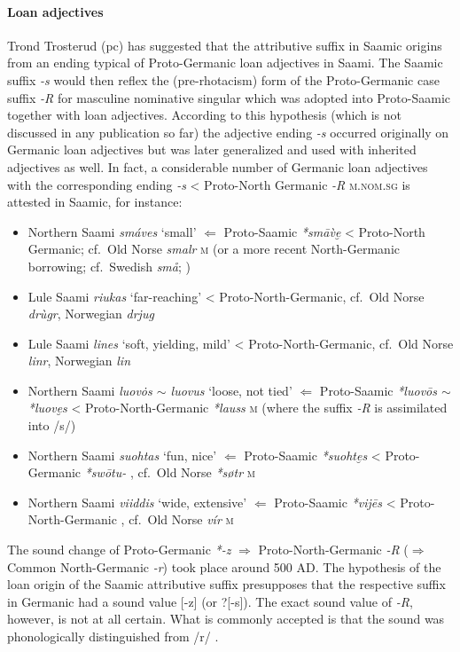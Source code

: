 {\paragraph{Loan adjectives} Trond Trosterud (pc) has suggested that the attributive suffix in Saamic origins from an ending typical of Proto-Germanic loan adjectives in Saami. The Saamic suffix \textit{-s} would then reflex the (pre-rhotacism) form of the Proto-Germanic case suffix \textit{-R} for masculine nominative singular which was adopted into Proto-Saamic together with loan adjectives. According to this hypothesis (which is not discussed in any publication so far) the adjective ending \mbox{\textit{-s}} occurred originally on Germanic loan adjectives but was later generalized and used with inherited adjectives as well. In fact, a considerable number of Germanic loan adjectives with the corresponding ending \textit{-s} < Proto-North Germanic \textit{-R} \textsc{m.nom.sg} is attested in Saamic, for instance:
\begin{itemize}
\item Northern Saami \textit{smáves} ‘small’ $\Leftarrow$ Proto-Saamic \textit{*smāv̀e̮} < Proto-North Germanic; cf.~Old Norse \textit{smalr} \textsc{m} (or a more recent North-Germanic borrowing; cf.~Swedish \textit{sm\aa}; \citealt[263]{sammallahti1998b})
\item Lule Saami \textit{riukas} ‘far-reaching’ < Proto-North-Germanic, cf.~Old Norse \textit{drùgr}, Norwegian \textit{drjug} \cite[267]{qvigstad1893}
\item Lule Saami \textit{lines} ‘soft, yielding, mild’ < Proto-North-Germanic, cf.~Old Norse \textit{linr}, Norwegian \textit{lin} \cite[218]{qvigstad1893}
\item Northern Saami \textit{luov\.{o}s $\sim$ luovus} ‘loose, not tied’ $\Leftarrow$ Proto-Saamic \textit{*luovōs $\sim$ *luove̮s} < Proto-North-Germanic \textit{*lauss} \textsc{m} (where the suffix \textit{-R} is assimilated into /s/) \cite[264]{sammallahti1998b}
\item Northern Saami \textit{suohtas} ‘fun, nice’ $\Leftarrow$ Proto-Saamic \textit{*suohte̮s} < Proto-Germanic \textit{*swōtu-} \cite[264]{sammallahti1998b}, cf.~Old Norse \textit{*søtr} \textsc{m} 
\item Northern Saami \textit{viiddis} ‘wide, extensive’ $\Leftarrow$ Proto-Saamic \textit{*vij{\dh}ēs} < Proto-North-Germanic \cite[148–149]{lehtiranta1989}, cf.~Old Norse \textit{v\'i{\dh}r} \textsc{m}
\end{itemize}
The sound change of Proto-Germanic \textit{*-z} $\Rightarrow$ Proto-North-Germanic \textit{-R} ($\Rightarrow$ Common North-Germanic \textit{-r}) took place around 500 AD. The hypothesis of the loan origin of the Saamic attributive suffix presupposes that the respective suffix in Germanic had a sound value [-z] (or ?[-s]). The exact sound value of \textit{-R}, however, is not at all certain. What is commonly accepted is that the sound was phonologically distinguished from /r/ \citep{skold1954}.

}
